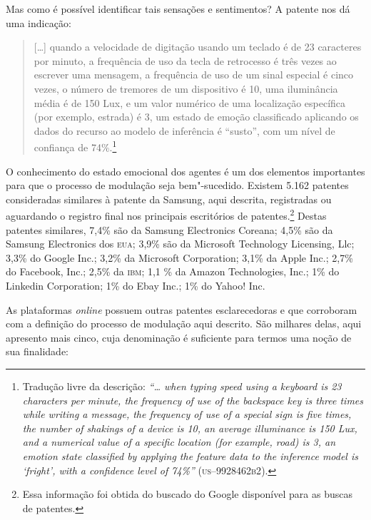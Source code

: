 Mas como é possível identificar tais sensações e sentimentos? A patente
nos dá uma indicação:

\begin{quote}
{[}\ldots{}{]} quando a velocidade de digitação usando um teclado é de 23
caracteres por minuto, a frequência de uso da tecla de retrocesso é três
vezes ao escrever uma mensagem, a frequência de uso de um sinal especial
é cinco vezes, o número de tremores de um dispositivo é 10, uma
iluminância média é de 150 Lux, e um valor numérico de uma localização
específica (por exemplo, estrada) é 3, um estado de emoção classificado
aplicando os dados do recurso ao modelo de inferência é ``susto'', com
um nível de confiança de 74\%.\footnote{Tradução livre da descrição:
  \textit{``\ldots{} when typing speed using a keyboard is 23 characters per
    minute, the frequency of use of the backspace key is three times while
    writing a message, the frequency of use of a special sign is five
    times, the number of shakings of a device is 10, an average
    illuminance is 150 Lux, and a numerical value of a specific location
    (for example, road) is 3, an emotion state classified by applying the
    feature data to the inference model is `fright', with a confidence
    level of 74\%''} (\textsc{us--9928462b2}).} 
\end{quote}

O conhecimento do estado emocional dos agentes é um dos elementos
importantes para que o processo de modulação seja bem"-sucedido. Existem
5.162 patentes consideradas similares à patente da Samsung, aqui
descrita, registradas ou aguardando o registro final nos principais
escritórios de patentes.\footnote{Essa informação foi obtida do buscado
  do Google disponível para as buscas de patentes.} Destas patentes
similares, 7,4\% são da Samsung Electronics Coreana; 4,5\% são da
Samsung Electronics dos \textsc{eua}; 3,9\% são da Microsoft Technology
Licensing, Llc; 3,3\% do Google Inc.; 3,2\% da Microsoft Corporation;
3,1\% da Apple Inc.; 2,7\% do Facebook, Inc.; 2,5\% da \textsc{ibm}; 1,1 \% da
Amazon Technologies, Inc.; 1\% do Linkedin Corporation; 1\% do Ebay
Inc.; 1\% do Yahoo! Inc.

As plataformas \textit{online} possuem outras patentes esclarecedoras e que
corroboram com a definição do processo de modulação aqui descrito. São
milhares delas, aqui apresento mais cinco, cuja denominação é suficiente
para termos uma noção de sua finalidade:

